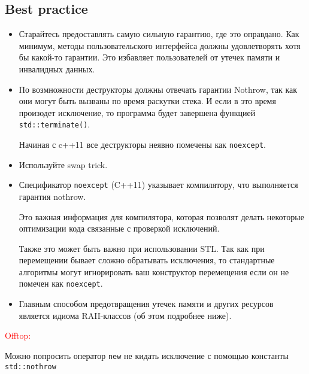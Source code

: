 \subsection{Best practice}
\begin{itemize}

\item
Старайтесь предоставлять самую сильную гарантию, где это оправдано.
Как минимум, методы пользовательского интерфейса должны удовлетворять хотя бы какой-то гарантии. Это избавляет пользователей от утечек памяти и инвалидных данных.

\item
 По возмножности деструкторы должны отвечать гарантии Nothrow, так как они могут быть вызваны по время раскутки стека. И если в это время произодет исключение, то программа будет завершена функцией \texttt{std::terminate()}.

 Начиная с c++11 все деструкторы неявно помечены как \texttt{noexcept}.

\item Используйте swap trick.

\item Спецификатор \texttt{noexcept} (C++11) указывает компилятору, что выполняется гарантия nothrow.

Это важная информация для компилятора, которая позволят делать некоторые оптимизации кода связанные с проверкой исключений.

Также это может быть важно при использовании STL. Так как при перемещении бывает сложно обратывать исключения, то стандартные алгоритмы могут игнорировать ваш конструктор перемещения если он не помечен как \texttt{noexcept}.

\item
Главным способом предотвращения утечек памяти и других ресурсов является идиома RAII-классов (об этом подробнее ниже).

\end{itemize}
\textcolor{red}{Offtop:}

Можно попросить оператор \texttt{new} не кидать исключение с помощью константы \texttt{std::nothrow}
